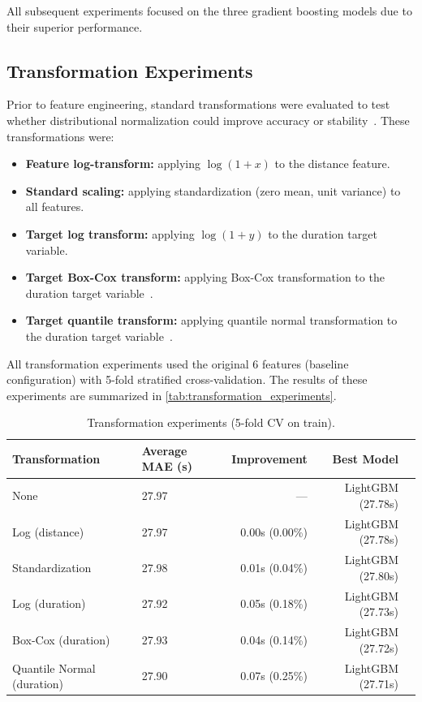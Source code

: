 All subsequent experiments focused on the three gradient boosting models due to their superior performance.

\subsection{Transformation Experiments}
Prior to feature engineering, standard transformations were evaluated to test whether distributional normalization could improve accuracy or stability~\cite{pedregosa2011scikit}. These transformations were:

\begin{itemize}
    \item \textbf{Feature log-transform:} applying $\log(1+x)$ to the distance feature.
    \item \textbf{Standard scaling:} applying standardization (zero mean, unit variance) to all features.
    \item \textbf{Target log transform:} applying $\log(1+y)$ to the duration target variable.
    \item \textbf{Target Box-Cox transform:} applying Box-Cox transformation to the duration target variable~\cite{box1964analysis}.
    \item \textbf{Target quantile transform:} applying quantile normal transformation to the duration target variable~\cite{himeno2009progress}.
\end{itemize}

All transformation experiments used the original 6 features (baseline configuration) with 5-fold stratified cross-validation.
The results of these experiments are summarized in \autoref{tab:transformation_experiments}.

\begin{table}[htbp]
    \centering
    \caption{Transformation experiments (5-fold CV on train).}
    \label{tab:transformation_experiments}
    \begin{tabular}{llrrr}
        \toprule
        \textbf{Transformation} & \textbf{Average MAE (s)} & \textbf{Improvement} & \textbf{Best Model} \\
        \midrule
        None & 27.97 & --- & LightGBM (27.78s) \\
        Log (distance) & 27.97 & 0.00s (0.00\%) & LightGBM (27.78s) \\
        Standardization & 27.98 & 0.01s (0.04\%) & LightGBM (27.80s) \\
        Log (duration) & 27.92 & 0.05s (0.18\%) & LightGBM (27.73s) \\
        Box-Cox (duration) & 27.93 & 0.04s (0.14\%) & LightGBM (27.72s) \\
        Quantile Normal (duration) & 27.90 & 0.07s (0.25\%) & LightGBM (27.71s) \\
        \bottomrule
    \end{tabular}
\end{table}

